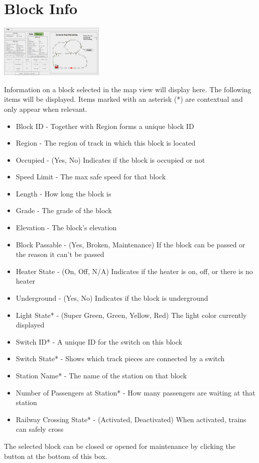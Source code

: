 \documentclass{scrreprt}
\begin{document}
\section{Block Info}
\begin{center}
  \includegraphics[trim={8.75cm 6.7cm 19.2cm 3.2cm},clip,width=5cm]{CTC-main}
\end{center}
Information on a block selected in the map view will display here. The following items 
will be displayed. Items marked with an asterisk (*) are contextual and only appear when 
relevant. 
\begin{itemize}
  \item Block ID - Together with Region forms a unique block ID
  \item Region - The region of track in which this block is located
  \item Occupied - (Yes, No) Indicates if the block is occupied or not
  \item Speed Limit - The max safe speed for that block
  \item Length - How long the block is
  \item Grade - The grade of the block
  \item Elevation - The block's elevation
  \item Block Passable - (Yes, Broken, Maintenance) If the block can be passed or the reason 
  it can't be passed
  \item Heater State - (On, Off, N/A) Indicates if the heater is on, off, or there is no heater
  \item Underground - (Yes, No) Indicates if the block is underground
  \item Light State* - (Super Green, Green, Yellow, Red) The light color currently displayed
  \item Switch ID* - A unique ID for the switch on this block
  \item Switch State* - Shows which track pieces are connected by a switch
  \item Station Name* - The name of the station on that block
  \item Number of Passengers at Station* - How many passengers are waiting at that station
  \item Railway Crossing State* - (Activated, Deactivated) When activated, trains can safely cross
\end{itemize}
The selected block can be closed or opened for maintenance by clicking the button at the 
bottom of this box.
\end{document}
